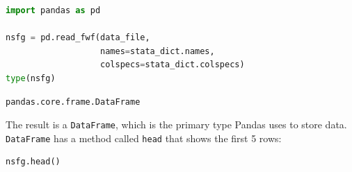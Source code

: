 \documentclass[
]{book}
\newcommand{\passthrough}[1]{#1}
\begin{document}
\begin{lstlisting}[language=Python]
import pandas as pd

nsfg = pd.read_fwf(data_file, 
                   names=stata_dict.names, 
                   colspecs=stata_dict.colspecs)
type(nsfg)
\end{lstlisting}

\begin{lstlisting}
pandas.core.frame.DataFrame
\end{lstlisting}

The result is a \passthrough{\lstinline!DataFrame!}, which is the
primary type Pandas uses to store data.
\passthrough{\lstinline!DataFrame!} has a method called
\passthrough{\lstinline!head!} that shows the first 5 rows:

\begin{lstlisting}[language=Python]
nsfg.head()
\end{lstlisting}
\end{document}
